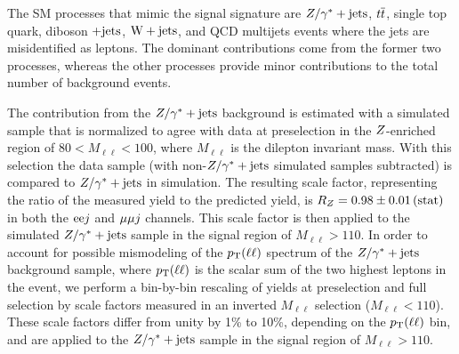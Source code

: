 The SM processes that mimic the signal signature are $\relax{Z}/\gamma^* + {\rm jets}$, $\relax{t}\overline{\relax{t}}$, single top quark, diboson $ + {\rm jets}$, $\mathrm{W} + {\rm jets}$, and QCD multijets events where the jets are misidentified as leptons.  The dominant contributions come from the former two processes, whereas the other processes provide minor contributions to the total number of background events. 
 
The contribution from the $\relax{Z}/\gamma^* + {\rm jets}$ background is estimated with a simulated sample that is normalized to agree with data at preselection in the $\relax{Z}$-enriched region of $80 < M_{\ell\ell} < 100$\GeV, where $M_{\ell\ell}$ is the dilepton invariant mass.  With this selection the data sample (with non-$\relax{Z}/\gamma^* + {\rm jets}$ simulated samples subtracted) is compared to $\relax{Z}/\gamma^* + {\rm jets}$ in simulation.  The resulting scale factor, representing the ratio of the measured yield to the predicted yield, is $R_{\relax{Z}} = 0.98 \pm 0.01 \,\text{(stat)}$ in both the $\mathrm{e} \mathrm{e} j$ and ${\mu} {\mu} j$ channels.  This scale factor is then applied to the simulated $\relax{Z}/\gamma^* + {\rm jets}$ sample in the signal region of $M_{\ell\ell} > 110$\GeV.  In order to account for possible mismodeling of the $p_{\mathrm{T}}(\ell\ell)$ spectrum of the $\relax{Z}/\gamma^* + {\rm jets}$ background sample, where $p_{\mathrm{T}}(\ell\ell)$ is the scalar sum of the two highest \PT leptons in the event, we perform a bin-by-bin rescaling of yields at preselection and full selection by scale factors measured in an inverted $M_{\ell\ell}$ selection ($M_{\ell\ell} < 110$\GeV).  These scale factors differ from unity by 1\% to 10\%, depending on the $p_{\mathrm{T}}(\ell\ell)$ bin, and are applied to the $\relax{Z}/\gamma^* + {\rm jets}$ sample in the signal region of $M_{\ell\ell} > 110$\GeV.

